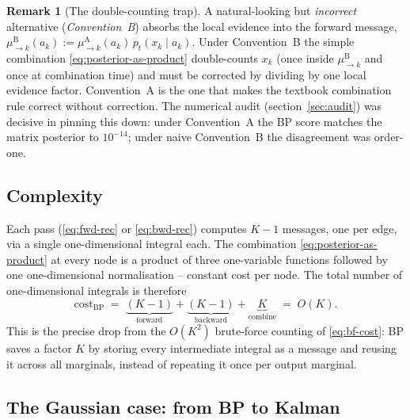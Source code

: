 \documentclass[11pt]{article}
\theoremstyle{definition}
\newtheorem{remark}{Remark}
\begin{document}
\begin{remark}[The double-counting trap]
A natural-looking but \emph{incorrect} alternative
(\emph{Convention~B}) absorbs the local evidence into the forward
message,
\(\mu_{\to k}^{\mathrm B}(a_k) := \mu_{\to k}^{\mathrm A}(a_k)\, p_t(x_k \mid a_k)\).
Under Convention~B the simple combination
\eqref{eq:posterior-as-product} double-counts \(x_k\) (once inside
\(\mu_{\to k}^{\mathrm B}\) and once at combination time) and must be
corrected by dividing by one local evidence factor. Convention~A is
the one that makes the textbook combination rule correct without
correction. The numerical audit
(section~\ref{sec:audit}) was decisive in pinning this down: under
Convention~A the BP score matches the matrix posterior to
\(10^{-14}\); under naive Convention~B the disagreement was
order-one.
\end{remark}

\subsection{Complexity}

\begin{computation}
Each pass (\eqref{eq:fwd-rec} or \eqref{eq:bwd-rec}) computes
\(K - 1\) messages, one per edge, via a single one-dimensional integral
each. The combination \eqref{eq:posterior-as-product} at every node is
a product of three one-variable functions followed by one
one-dimensional normalisation -- constant cost per node. The total
number of one-dimensional integrals is therefore
\begin{equation}\label{eq:bp-cost}
    \mathrm{cost}_{\mathrm{BP}}
    \;=\; \underbrace{(K - 1)}_{\text{forward}}
        + \underbrace{(K - 1)}_{\text{backward}}
        + \underbrace{K}_{\text{combine}}
    \;=\; O(K).
\end{equation}
This is the precise drop from the \(O(K^2)\) brute-force counting of
\eqref{eq:bf-cost}: BP saves a factor \(K\) by storing every
intermediate integral as a message and reusing it across all
marginals, instead of repeating it once per output marginal.
\end{computation}

\subsection{The Gaussian case: from BP to Kalman}\label{sec:bp-gaussian}
\end{document}
